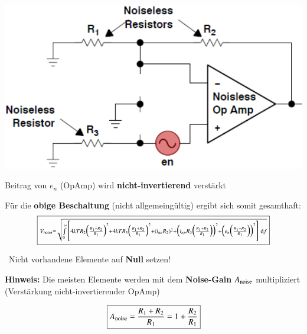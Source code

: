 \begin{minipage}[c]{0.4\columnwidth}
    \includegraphics[width=\columnwidth]{images/rauschen_opamp_en.png}
\end{minipage}
\hfill
\begin{minipage}[c]{0.58\columnwidth}
    Beitrag von $e_n$ (OpAmp) wird \textbf{nicht-invertierend} verstärkt 

\end{minipage}

\vspace{0.2cm}
Für die \textbf{obige Beschaltung} (nicht allgemeingültig) ergibt sich somit gesamthaft:
$$ \boxed{ \scriptstyle{  V_{\rm noise} = \sqrt{ \int\limits_{0}^{\infty} \,  \Biggl[
    4 k T R_2 \Bigl( \frac{R_1 + R_2}{R_1} \Bigr)^2 + 4 k T R_3 \Bigl( \frac{R_1 + R_2}{R_1} \Bigr)^2
    + (i_{nn} R_2 )^2 + \Bigl(  i_{np} R_3 \Bigl( \frac{R_1 + R_2}{R_1} \Bigr) \Bigr)^2
    +  \Bigl(  e_n \Bigl( \frac{R_1 + R_2}{R_1} \Bigr) \Bigr)^2
    \Biggr] \, \ensuremath{\mathop{} \! \mathrm{d}}f } }} $$

\textrightarrow\ Nicht vorhandene Elemente auf \textbf{Null} setzen!

\vspace{0.2cm}
\begin{minipage}[c]{0.48\columnwidth}
    \textbf{Hinweis:} Die meisten Elemente werden mit dem \textbf{Noise-Gain} $A_{\rm noise}$ multipliziert 
    (Verstärkung nicht-invertierender OpAmp)
\end{minipage}
\hfill
\begin{minipage}[c]{0.48\columnwidth}
    $$ \boxed{ A_{\rm noise} = \frac{R_1 + R_2}{R_1} = 1 + \frac{R_2}{R_1}}$$
\end{minipage}


